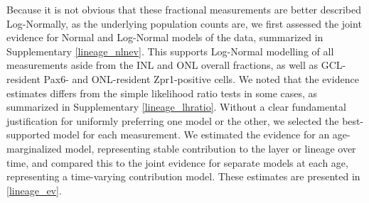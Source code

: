 Because it is not obvious that these fractional measurements are better described Log-Normally, as the underlying population counts are, we first assessed the joint evidence for Normal and Log-Normal models of the data, summarized in Supplementary \autoref{lineage_nlnev}. This supports Log-Normal modelling of all measurements aside from the INL and ONL overall fractions, as well as GCL-resident Pax6- and ONL-resident Zpr1-positive cells. We noted that the evidence estimates differs from the simple likelihood ratio tests in some cases, as summarized in Supplementary \autoref{lineage_lhratio}.  Without a clear fundamental justification for uniformly preferring one model or the other, we selected the best-supported model for each measurement. We estimated the evidence for an age-marginalized model, representing stable contribution to the layer or lineage over time, and compared this to the joint evidence for separate models at each age, representing a time-varying contribution model. These estimates are presented in \autoref{lineage_ev}.

